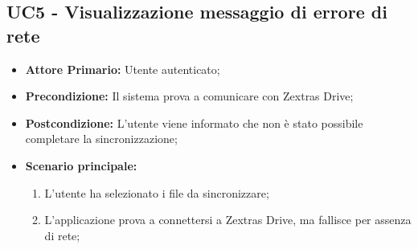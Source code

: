 \subsection{UC5 - Visualizzazione messaggio di errore di rete}
\begin{itemize}
\item \textbf{Attore Primario:} Utente autenticato;
\item \textbf{Precondizione:} Il sistema prova a comunicare con Zextras Drive;
\item \textbf{Postcondizione:} L'utente viene informato che non è stato possibile completare la sincronizzazione;
\item \textbf{Scenario principale:}
    \begin{enumerate}
    \item L'utente ha selezionato i file da sincronizzare;
    \item L'applicazione prova a connettersi a Zextras Drive, ma fallisce per assenza di rete;
    \end{enumerate}
\end{itemize}